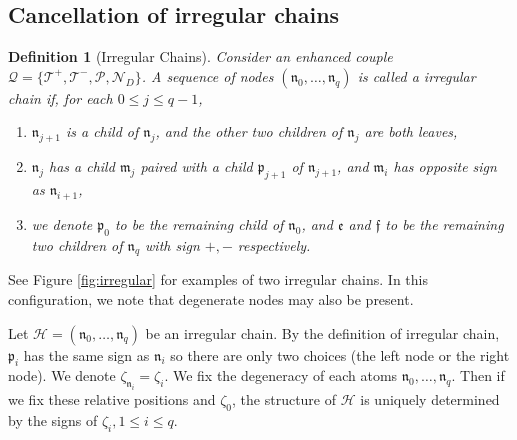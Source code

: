 \documentclass[UTF-8,reqno]{amsart}
\numberwithin{equation}{section}
\newtheorem{definition}[theorem]{Definition}
\theoremstyle{definition}
\def\leq{\leqslant}
\def\leq{\leqslant}
\begin{document}
\subsection{Cancellation of irregular chains}\label{irregular}


\begin{definition} [Irregular Chains]\label{def:chain-couple}
 Consider an enhanced couple $\mathcal{Q}=\{\mathcal{T}^+,\mathcal{T}^-,\mathcal{P},\mathcal{N}_D\}$. A sequence of nodes $(\mathfrak{n}_0, \ldots, \mathfrak{n}_q)$ is called a  irregular chain if, for each $0 \leq j \leq q-1$, 
\begin{enumerate}
    \item $\mathfrak{n}_{j+1}$ is a child of $\mathfrak{n}_{j}$, and the other two children of $\mathfrak{n}_{j}$ are both leaves,
    \item $\mathfrak{n}_{j}$ has a child $\mathfrak{m}_{j}$ paired with a child $\mathfrak{p}_{j+1}$ of $\mathfrak{n}_{j+1}$, and $\mathfrak m_i$ has opposite sign as $\mathfrak n_{i+1}$,
    \item  we denote $\mathfrak p_0$ to be the remaining child of $\mathfrak n_0$, and 
   $\mathfrak e$ and $\mathfrak f$ to be the remaining two children of $\mathfrak n_q$ with sign $+,-$ respectively.

\end{enumerate}
\end{definition}See Figure \ref{fig:irregular} for examples of two irregular chains. In this configuration, we note that degenerate nodes may also be present.

Let $\mathcal{H}=(\mathfrak{n}_0, \ldots, \mathfrak{n}_q)$ be an irregular chain. By the  definition of irregular chain, $\mathfrak{p}_i$ has the same sign as $\mathfrak{n}_i$ so there are only two choices (the left node or the right node). We denote $\zeta_{\mathfrak{n}_i}=\zeta_i$. We fix the degeneracy of each atoms $\mathfrak{n}_0, \ldots, \mathfrak{n}_q$. Then if we fix  these relative positions and $\zeta_0$, the structure of $\mathcal{H}$ is uniquely
 determined by the signs of $\zeta_i,1\leq i\leq q$.
 
\end{document}
